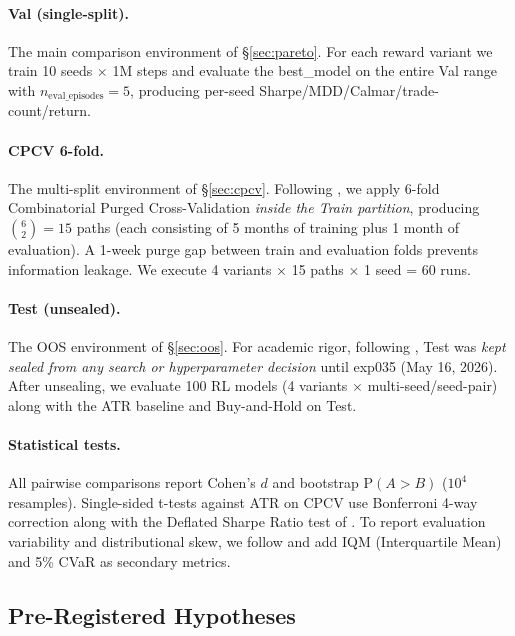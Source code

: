 \documentclass[11pt, a4paper]{article}
\begin{document}
\paragraph{Val (single-split).}
The main comparison environment of \S\ref{sec:pareto}. For each reward variant
we train 10 seeds $\times$ 1M steps and evaluate the best\_model on the entire
Val range with $n_{\text{eval\_episodes}}=5$, producing per-seed
Sharpe/MDD/Calmar/trade-count/return.

\paragraph{CPCV 6-fold.}
The multi-split environment of \S\ref{sec:cpcv}. Following
\citet{lopezdeprado2018advances}, we apply 6-fold Combinatorial Purged
Cross-Validation \emph{inside the Train partition}, producing
$\binom{6}{2}=15$ paths (each consisting of 5 months of training plus
1 month of evaluation). A 1-week purge gap between train and evaluation folds
prevents information leakage. We execute 4 variants $\times$ 15 paths $\times$
1 seed = 60 runs.

\paragraph{Test (unsealed).}
The OOS environment of \S\ref{sec:oos}. For academic rigor, following
\citet{gort2022backtest}, Test was \emph{kept sealed from any search or
hyperparameter decision} until exp035 (May 16, 2026). After unsealing, we
evaluate 100 RL models (4 variants $\times$ multi-seed/seed-pair) along with
the ATR baseline and Buy-and-Hold on Test.

\paragraph{Statistical tests.}
All pairwise comparisons report Cohen's $d$ and bootstrap $\mathrm{P}(A > B)$
($10^4$ resamples). Single-sided t-tests against ATR on CPCV use Bonferroni
4-way correction along with the Deflated Sharpe Ratio test of
\citet{lopezdeprado2014dsr}. To report evaluation variability and distributional
skew, we follow \citet{henderson2018rlreproducibility} and add IQM
(Interquartile Mean) and 5\% CVaR as secondary metrics.

\subsection{Pre-Registered Hypotheses}
\label{sec:hypotheses}
\end{document}
